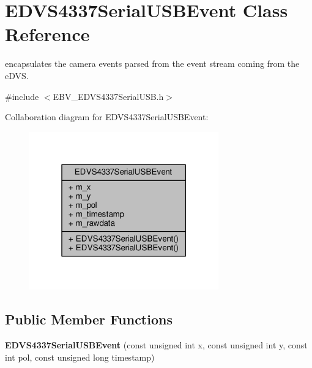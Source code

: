 \hypertarget{struct_e_d_v_s4337_serial_u_s_b_event}{}\section{E\+D\+V\+S4337\+Serial\+U\+S\+B\+Event Class Reference}
\label{struct_e_d_v_s4337_serial_u_s_b_event}


encapsulates the camera events parsed from the event stream coming from the e\+D\+V\+S.  




{\ttfamily \#include $<$E\+B\+V\+\_\+\+E\+D\+V\+S4337\+Serial\+U\+S\+B.\+h$>$}



Collaboration diagram for E\+D\+V\+S4337\+Serial\+U\+S\+B\+Event\+:
\nopagebreak
\begin{figure}[H]
\begin{center}
\leavevmode
\includegraphics[width=232pt]{struct_e_d_v_s4337_serial_u_s_b_event__coll__graph}
\end{center}
\end{figure}
\subsection*{Public Member Functions}
\begin{DoxyCompactItemize}
\item 
\hypertarget{struct_e_d_v_s4337_serial_u_s_b_event_af943a6148b48468f291cf35ade44bcea}{}{\bfseries E\+D\+V\+S4337\+Serial\+U\+S\+B\+Event} (const unsigned int x, const unsigned int y, const int pol, const unsigned long timestamp)\label{struct_e_d_v_s4337_serial_u_s_b_event_af943a6148b48468f291cf35ade44bcea}

\end{DoxyCompactItemize}
